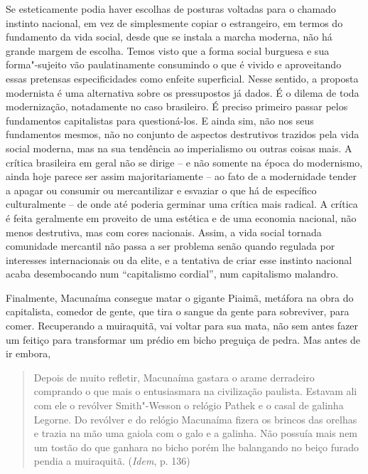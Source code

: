Se esteticamente podia haver escolhas de posturas voltadas para o
chamado instinto nacional, em vez de simplesmente copiar o estrangeiro,
em termos do fundamento da vida social, desde que se instala a marcha
moderna, não há grande margem de escolha. Temos visto que a forma social
burguesa e sua forma"-sujeito vão paulatinamente consumindo o que é
vivido e aproveitando essas pretensas especificidades como enfeite
superficial. Nesse sentido, a proposta modernista é uma alternativa
sobre os pressupostos já dados. É o dilema de toda modernização,
notadamente no caso brasileiro. É preciso primeiro passar pelos
fundamentos capitalistas para questioná-los. E ainda sim, não nos seus
fundamentos mesmos, não no conjunto de aspectos destrutivos trazidos
pela vida social moderna, mas na sua tendência ao imperialismo ou outras
coisas mais. A crítica brasileira em geral não se dirige -- e não
somente na época do modernismo, ainda hoje parece ser assim
majoritariamente -- ao fato de a modernidade tender a apagar ou consumir
ou mercantilizar e esvaziar o que há de específico culturalmente -- de
onde até poderia germinar uma crítica mais radical. A crítica é feita
geralmente em proveito de uma estética e de uma economia nacional, não
menos destrutiva, mas com cores nacionais. Assim, a vida social tornada
comunidade mercantil não passa a ser problema senão quando regulada por
interesses internacionais ou da elite, e a tentativa de criar esse
instinto nacional acaba desembocando num ``capitalismo cordial'', num
capitalismo malandro.

Finalmente, Macunaíma consegue matar o gigante Piaimã, metáfora na obra
do capitalista, comedor de gente, que tira o sangue da gente para
sobreviver, para comer. Recuperando a muiraquitã, vai voltar para sua
mata, não sem antes fazer um feitiço para transformar um prédio em bicho
preguiça de pedra. Mas antes de ir embora,

\begin{quote}
Depois de muito refletir, Macunaíma gastara o arame derradeiro comprando
o que mais o entusiasmara na civilização paulista. Estavam ali com ele o
revólver Smith"-Wesson o relógio Pathek e o casal de galinha Legorne. Do
revólver e do relógio Macunaíma fizera os brincos das orelhas e trazia
na mão uma gaiola com o galo e a galinha. Não possuía mais nem um tostão
do que ganhara no bicho porém lhe balangando no beiço furado pendia a
muiraquitã. (\emph{Idem}, p. 136)
\end{quote}


